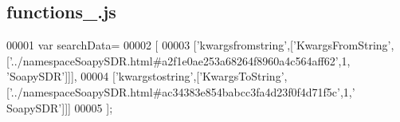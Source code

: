 \subsection{functions\+\_.\+js}
\label{functions__7_8js_source}

\begin{DoxyCode}
00001 var searchData=
00002 [
00003   [\textcolor{stringliteral}{'kwargsfromstring'},[\textcolor{stringliteral}{'KwargsFromString'},[\textcolor{stringliteral}{'../namespaceSoapySDR.html#a2f1e0ae253a68264f8960a4c564aff62'},1,\textcolor{stringliteral}{
      'SoapySDR'}]]],
00004   [\textcolor{stringliteral}{'kwargstostring'},[\textcolor{stringliteral}{'KwargsToString'},[\textcolor{stringliteral}{'../namespaceSoapySDR.html#ac34383e854babcc3fa4d23f0f4d71f5c'},1,\textcolor{stringliteral}{'
      SoapySDR'}]]]
00005 ];
\end{DoxyCode}
